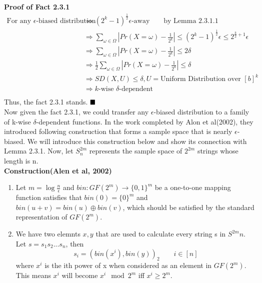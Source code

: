 \documentclass[a4paper, english]{paper}
\begin{document}
	\noindent\textbf{Proof of Fact 2.3.1}
	\begin{align*}
	\text{For any $\epsilon$-biased distribution }&\Rightarrow (2^k-1)^{\frac12}\epsilon\text{-away}\qquad\text{by Lemma 2.3.1.1}\\
	&\Rightarrow \sum_{\omega\in \Omega}| Pr(X = \omega) - \frac1{2^k}|\le (2^k-1)^{\frac12}\epsilon\le2^{\frac k2+1}\epsilon\\
	&\Rightarrow \sum_{\omega\in \Omega}| Pr(X = \omega) - \frac1{2^k}|\le 2\delta\\
	&\Rightarrow \frac12\sum_{\omega\in \Omega}| Pr(X = \omega) - \frac1{2^k}|\le \delta\\
 	&\Rightarrow SD(X,U)\le \delta, U=\text{Uniform Distribution over }[b]^k\\
	&\Rightarrow k\text{-wise }\delta\text{-dependent }\\
	\end{align*}
	Thus, the fact 2.3.1 stands. $\hfill\blacksquare$ \\

Now given the fact 2.3.1, we could transfer any $\epsilon$-biased distribution to a family of k-wise $\delta$-dependent functions. In the work completed by Alon et al(2002), they introduced following construction that forms a sample space that is nearly $\epsilon$-biased. We will introduce this construction below and show its connection with Lemma 2.3.1. Now, let $S^{2m}_n$ represents the sample space of $2^{2m}$ strings whose length is n.\\
	\noindent\textbf{Construction(Alen et al, 2002)}
	\begin{enumerate}
	\item Let $m=\log\frac n \epsilon$ and $bin: GF(2^m)\rightarrow\{0,1\}^m$ be a one-to-one mapping function satisfies that $bin(0)=\{0\}^m$ and $bin(u+v)=bin(u)\oplus bin(v)$, which should be satisfied by the standard representation of $GF(2^m)$.
	\item We have two elemnts $x,y$ that are used to calculate every string s in $S^{2m}n$. Let $s = s_1s_2...s_n$, then $$s_i = (bin(x^i),bin(y))_2\qquad i\in[n]$$ where $x^i$ is the ith power of x when considered as an element in $GF(2^m)$. This means $x^i$ will become $x^i \mod 2^m$ iff $x^i\ge 2^m$.
	\end{enumerate}
\end{document}
